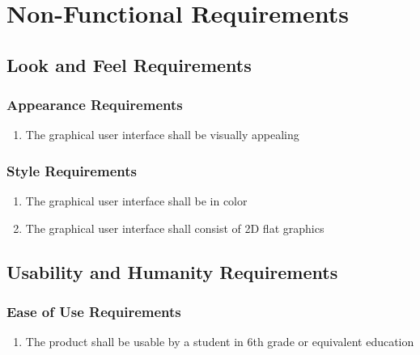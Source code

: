 \documentclass[]{article}
\begin{document}

\section{Non-Functional Requirements}
\label{sec:non-functional_requirements}
\subsection{Look and Feel Requirements}
\label{sub:look_and_feel_requirements}

\subsubsection{Appearance Requirements}
\label{ssub:appearance_requirements}
\begin{enumerate}[{LF}1. ]
	\item The graphical user interface shall be visually appealing
\end{enumerate}

\subsubsection{Style Requirements}
\label{ssub:style_requirements}
\begin{enumerate}[{LF}1. ]
	\item The graphical user interface shall be in color
	\item The graphical user interface shall consist of 2D flat graphics
\end{enumerate}


\subsection{Usability and Humanity Requirements}
\label{sub:usability_and_humanity_requirements}

\subsubsection{Ease of Use Requirements}
\label{ssub:ease_of_use_requirements}
\begin{enumerate}[{UH}1. ]
	\item The product shall be usable by a student in 6th grade or equivalent education
\end{enumerate}
\end{document}
